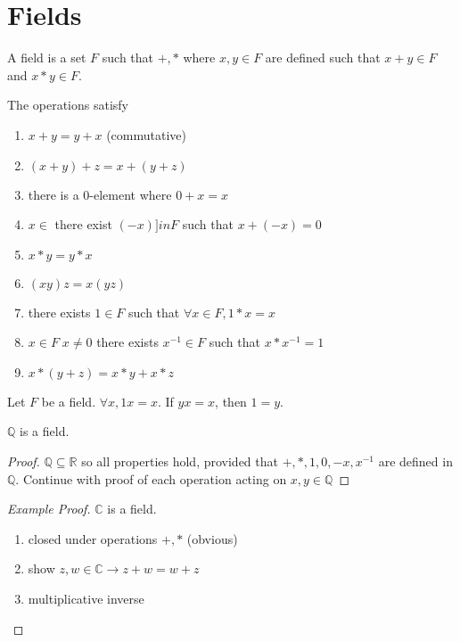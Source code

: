 
\section{Fields}

\begin{definition} 
	A field is a set $F$ such that $+,*$ where $x,y\in F$
	are defined such that $x+y\in F$ and $x*y\in F$.

	The operations satisfy
	\begin{enumerate} 
		\item $x+y=y+x$ (commutative)
		\item $(x+y)+z = x+(y+z) $
		\item there is a $0$-element where $0+x=x$
		\item $x\in$ there exist $(-x) ]in F$ such that $x+(-x)=0$
		\item $x*y=y*x$
		\item $(xy)z = x(yz)$
		\item there exists $1 \in F$ such that $\forall x\in F,1*x=x$
		\item $x\in F \; x\neq 0$ there exists $x^{-1}\in F$ such that
		$x*x^{-1}=1$
		\item $x*(y+z) = x*y + x*z$
	\end{enumerate}
\end{definition}

\begin{lemma}
	Let $F$ be a field. $\forall x, 1x=x$. If $yx=x$, then $1=y$. 
\end{lemma}

\begin{theorem} 
	$\mathbb{Q}$ is a field.
\end{theorem}
\begin{proof} 
	$\mathbb{Q} \subseteq \mathbb{R}$ so all properties hold, provided
	that $+,*,1,0,-x,x^{-1}$ are defined in $\mathbb{Q}$. 
	Continue with proof of each operation acting on $x,y\in \mathbb{Q}$
\end{proof}

\begin{proof}[Example Proof]
$\mathbb{C}$ is a field.	
\begin{enumerate} 
\item closed under operations $+,*$ (obvious)
\item show $z,w\in \mathbb{C} \rightarrow z+w=w+z$
\item multiplicative inverse
\end{enumerate}
\end{proof}

